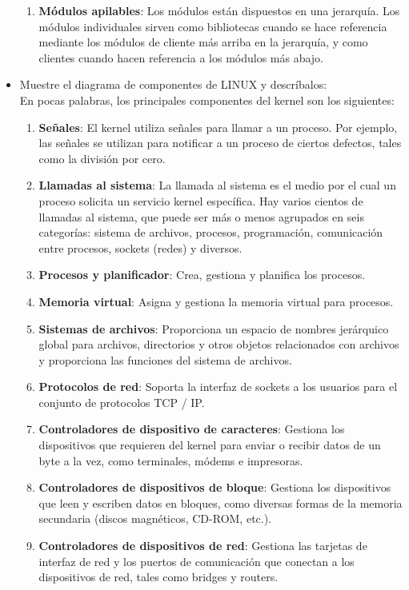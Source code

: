 \begin{itemize}
\begin{enumerate}
	\item \textbf{Módulos apilables}: Los módulos están dispuestos en una jerarquía. Los módulos individuales sirven como bibliotecas cuando se hace referencia mediante los módulos de cliente más arriba en la jerarquía, y como clientes cuando hacen referencia a los módulos más abajo.\\
\end{enumerate}

		\item Muestre el diagrama de componentes de LINUX y descríbalos:
		\\En pocas palabras, los principales componentes del kernel son los siguientes:
\begin{enumerate}
\item \textbf{Señales}: El kernel utiliza señales para llamar a un proceso. Por ejemplo, las señales se utilizan para notificar a un proceso de ciertos defectos, tales como la división por cero.
\item \textbf{Llamadas al sistema}: La llamada al sistema es el medio por el cual un proceso solicita un servicio kernel específica. Hay varios cientos de llamadas al sistema, que puede ser más o menos agrupados en seis categorías: sistema de archivos, procesos, programación, comunicación entre procesos, sockets (redes) y diversos.
\item \textbf{Procesos y planificador}: Crea, gestiona y planifica los procesos.
\item \textbf{Memoria virtual}: Asigna y gestiona la memoria virtual para procesos.
\item \textbf{Sistemas de archivos}: Proporciona un espacio de nombres jerárquico global para archivos, directorios y otros objetos relacionados con archivos y proporciona las funciones del sistema de archivos.
\item \textbf{Protocolos de red}: Soporta la interfaz de sockets a los usuarios para el conjunto de protocolos TCP / IP.
\item \textbf{Controladores de dispositivo de caracteres}: Gestiona los dispositivos que requieren del kernel para enviar o recibir datos de un byte a la vez, como terminales, módems e impresoras.
\item \textbf{Controladores de dispositivos de bloque}: Gestiona los dispositivos que leen y escriben datos en bloques, como diversas formas de la memoria secundaria (discos magnéticos, CD-ROM, etc.).
\item \textbf{Controladores de dispositivos de red}: Gestiona las tarjetas de interfaz de red y los puertos de comunicación que conectan a los dispositivos de red, tales como bridges y routers.

\end{enumerate}
\end{itemize}

